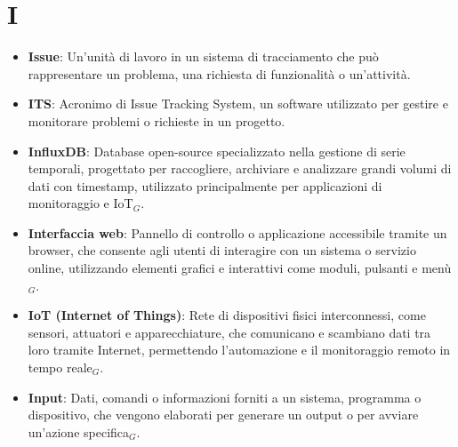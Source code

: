 \section{I}
\begin{itemize}
    \item \textbf{Issue}: Un'unità di lavoro in un sistema di tracciamento che può rappresentare un problema, una richiesta di funzionalità o un'attività.
    \item \textbf{ITS}: Acronimo di Issue Tracking System, un software utilizzato per gestire e monitorare problemi o richieste in un progetto.
    \item \textbf{InfluxDB}: Database open-source specializzato nella gestione di serie temporali, progettato per raccogliere, archiviare e analizzare grandi volumi di dati con timestamp, utilizzato principalmente per applicazioni di monitoraggio e IoT$_G$.
    \item \textbf{Interfaccia web}: Pannello di controllo o applicazione accessibile tramite un browser, che consente agli utenti di interagire con un sistema o servizio online, utilizzando elementi grafici e interattivi come moduli, pulsanti e menù$_G$.
    \item \textbf{IoT (Internet of Things)}: Rete di dispositivi fisici interconnessi, come sensori, attuatori e apparecchiature, che comunicano e scambiano dati tra loro tramite Internet, permettendo l'automazione e il monitoraggio remoto in tempo reale$_G$.
    \item \textbf{Input}: Dati, comandi o informazioni forniti a un sistema, programma o dispositivo, che vengono elaborati per generare un output o per avviare un'azione specifica$_G$.

\end{itemize}
